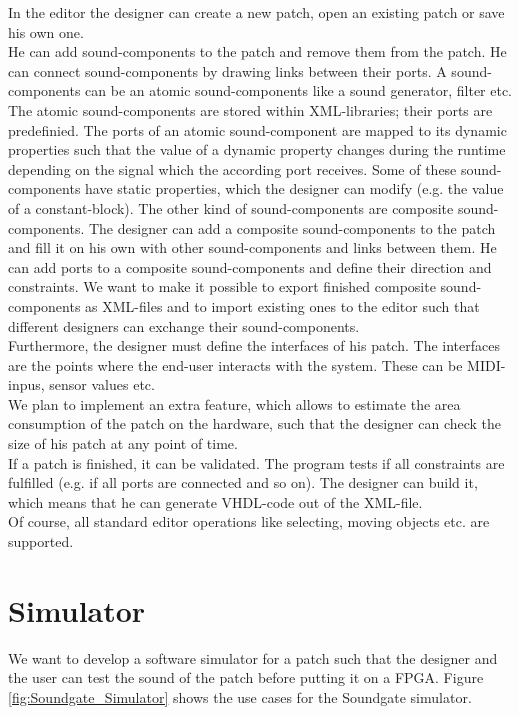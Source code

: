 In the editor the designer can create a new patch, open an existing patch or save his own one. \\
He can add sound-components to the patch and remove them from the patch. He can connect sound-components by drawing links between their ports. A sound-components can be an atomic sound-components like a sound generator, filter etc. The atomic sound-components are stored within XML-libraries; their ports are predefinied. The ports of an atomic sound-component are mapped to its dynamic properties such that the value of a dynamic property changes during the runtime depending on the signal which the according port receives.  Some of these sound-components have static properties, which the designer can modify (e.g. the value of a constant-block). The other kind of sound-components are composite sound-components. The designer can add a composite sound-components to the patch and fill it on his own with other sound-components and links between them. He can add ports to a composite sound-components and define their direction and constraints. We want to make it possible to export finished composite sound-components as XML-files and to import existing ones to the editor such that different designers can exchange their sound-components.\\
Furthermore, the designer must define the interfaces of his patch. The interfaces are the points where the end-user interacts with the system. These can be MIDI-inpus, sensor values etc.\\
We plan to implement an extra feature, which allows to estimate the area consumption of the patch on the hardware, such that the designer can check the size of his patch at any point of time.\\
If a patch is finished, it can be validated. The program tests if all constraints are fulfilled (e.g. if all ports are connected and so on). The designer can build it, which means that he can generate VHDL-code out of the XML-file.\\
Of course, all standard editor operations like selecting, moving objects etc. are supported.

\section{Simulator}

We want to develop a software simulator for a patch such that the designer and the user can test the sound of the patch before putting it on a \ac{FPGA}. Figure \ref{fig:Soundgate_Simulator} shows the use cases for the Soundgate simulator.

